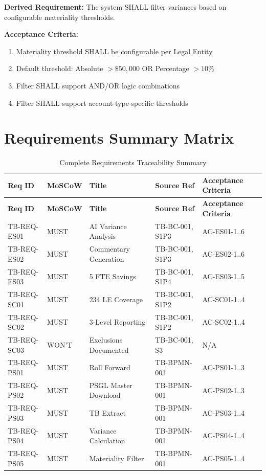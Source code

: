\documentclass[11pt,a4paper,twoside]{report}
\begin{document}
\textbf{Derived Requirement:} The system SHALL filter variances based on
configurable materiality thresholds.

\textbf{Acceptance Criteria:}
\begin{enumerate}[label=AC-PS05-\arabic*:]
\item Materiality threshold SHALL be configurable per Legal Entity
\item Default threshold: Absolute $> \$50,000$ OR Percentage $> 10\%$
\item Filter SHALL support AND/OR logic combinations
\item Filter SHALL support account-type-specific thresholds
\end{enumerate}

\section{Requirements Summary Matrix}
\label{sec:req-summary}

\begin{longtable}{p{2cm} p{1.2cm} p{4cm} p{3cm} p{2.5cm}}
\caption{Complete Requirements Traceability Summary} \\
\toprule
\textbf{Req ID} & \textbf{MoSCoW} & \textbf{Title} & \textbf{Source Ref} & \textbf{Acceptance Criteria} \\
\midrule
\endfirsthead
\toprule
\textbf{Req ID} & \textbf{MoSCoW} & \textbf{Title} & \textbf{Source Ref} & \textbf{Acceptance Criteria} \\
\midrule
\endhead
\rowcolor{sapblue!5}
TB-REQ-ES01 & MUST & AI Variance Analysis & TB-BC-001, S1P3 & AC-ES01-1..6 \\
TB-REQ-ES02 & MUST & Commentary Generation & TB-BC-001, S1P3 & AC-ES02-1..6 \\
\rowcolor{sapblue!5}
TB-REQ-ES03 & MUST & 5 FTE Savings & TB-BC-001, S1P4 & AC-ES03-1..5 \\
TB-REQ-SC01 & MUST & 234 LE Coverage & TB-BC-001, S1P2 & AC-SC01-1..4 \\
\rowcolor{sapblue!5}
TB-REQ-SC02 & MUST & 3-Level Reporting & TB-BC-001, S1P2 & AC-SC02-1..4 \\
TB-REQ-SC03 & WON'T & Exclusions Documented & TB-BC-001, S3 & N/A \\
\rowcolor{sapblue!5}
TB-REQ-PS01 & MUST & Roll Forward & TB-BPMN-001 & AC-PS01-1..3 \\
TB-REQ-PS02 & MUST & PSGL Master Download & TB-BPMN-001 & AC-PS02-1..3 \\
\rowcolor{sapblue!5}
TB-REQ-PS03 & MUST & TB Extract & TB-BPMN-001 & AC-PS03-1..4 \\
TB-REQ-PS04 & MUST & Variance Calculation & TB-BPMN-001 & AC-PS04-1..4 \\
\rowcolor{sapblue!5}
TB-REQ-PS05 & MUST & Materiality Filter & TB-BPMN-001 & AC-PS05-1..4 \\
\bottomrule
\end{longtable}
\end{document}
